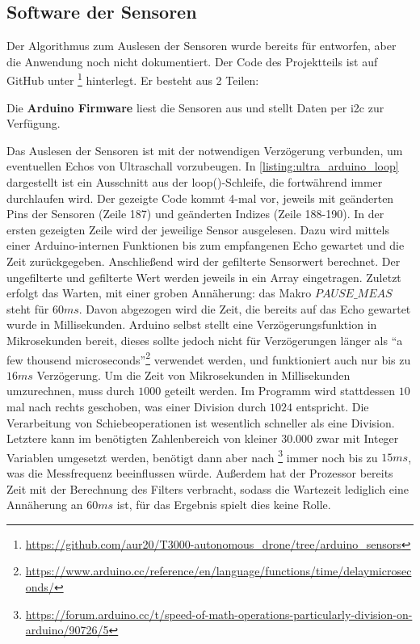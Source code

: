 \subsection{Software der Sensoren}
Der Algorithmus zum Auslesen der Sensoren wurde bereits für \cite[Kapitel 4.4]{markusreinErweiterungBestehenderDrohnen2023} entworfen, aber die Anwendung noch nicht dokumentiert. Der Code des Projektteils ist auf GitHub unter \footnote{\url{https://github.com/aur20/T3000-autonomous_drone/tree/arduino_sensors}} hinterlegt. Er besteht aus 2 Teilen:

Die \textbf{\large Arduino Firmware} liest die Sensoren aus und stellt Daten per \gls{i2c} zur Verfügung.

Das Auslesen der Sensoren ist mit der notwendigen Verzögerung verbunden, um eventuellen Echos von Ultraschall vorzubeugen. In \ref{listing:ultra_arduino_loop} dargestellt ist ein Ausschnitt aus der loop()-Schleife, die fortwährend immer durchlaufen wird. Der gezeigte Code kommt 4-mal vor, jeweils mit geänderten Pins der Sensoren (Zeile 187) und geänderten Indizes (Zeile 188-190). In der ersten gezeigten Zeile wird der jeweilige Sensor ausgelesen. Dazu wird mittels einer Arduino-internen Funktionen bis zum empfangenen Echo gewartet und die Zeit zurückgegeben. Anschließend wird der gefilterte Sensorwert berechnet. Der ungefilterte und gefilterte Wert werden jeweils in ein Array eingetragen. Zuletzt erfolgt das Warten, mit einer groben Annäherung: das Makro $PAUSE\_MEAS$ steht für $60ms$. Davon abgezogen wird die Zeit, die bereits auf das Echo gewartet wurde in Millisekunden. Arduino selbst stellt eine Verzögerungsfunktion in Mikrosekunden bereit, dieses sollte jedoch nicht für Verzögerungen länger als \enquote{a few thousend microseconds}\footnote{\url{https://www.arduino.cc/reference/en/language/functions/time/delaymicroseconds/}} verwendet werden, und funktioniert auch nur bis zu $16ms$ Verzögerung. Um die Zeit von Mikrosekunden in Millisekunden umzurechnen, muss durch $1000$ geteilt werden. Im Programm wird stattdessen $10$ mal nach rechts geschoben, was einer Division durch $1024$ entspricht. Die Verarbeitung von Schiebeoperationen ist wesentlich schneller als eine Division. Letztere kann im benötigten Zahlenbereich von kleiner $30.000$ zwar mit Integer Variablen umgesetzt werden, benötigt dann aber nach \footnote{\url{https://forum.arduino.cc/t/speed-of-math-operations-particularly-division-on-arduino/90726/5}} immer noch bis zu $15ms$, was die Messfrequenz beeinflussen würde. Außerdem hat der Prozessor bereits Zeit mit der Berechnung des Filters verbracht, sodass die Wartezeit lediglich eine Annäherung an $60ms$ ist, für das Ergebnis spielt dies keine Rolle.  

